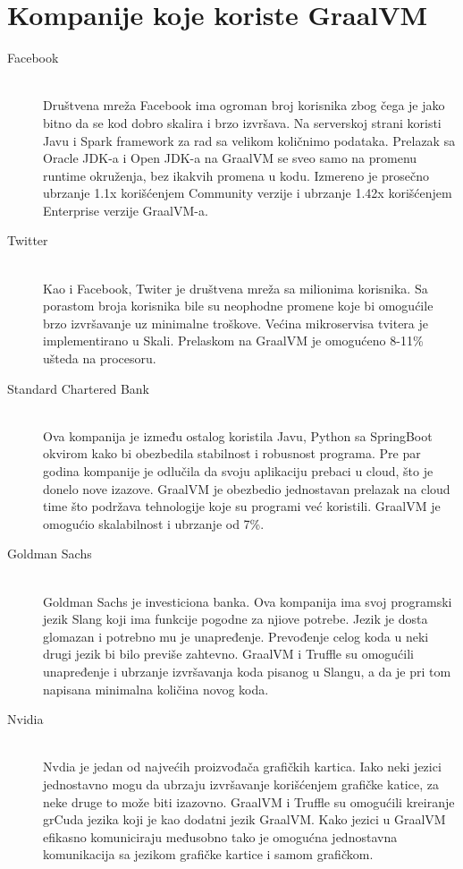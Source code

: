 \documentclass[a4paper]{article}
\begin{document}
\section{Kompanije koje koriste GraalVM}
\begin{description}
	\item[Facebook] \hfill \\
	Društvena mreža Facebook ima ogroman broj korisnika zbog čega je jako bitno da se kod dobro skalira i brzo izvršava.
	Na serverskoj strani koristi Javu i Spark framework za rad sa velikom količnimo podataka. Prelazak sa Oracle JDK-a i Open JDK-a na GraalVM se sveo samo na promenu runtime okruženja, bez ikakvih promena u kodu. Izmereno je prosečno ubrzanje 1.1x korišćenjem Community verzije i ubrzanje 1.42x korišćenjem Enterprise verzije GraalVM-a. \cite{graalvmusecases}
	
	\item[Twitter] \hfill \\
	Kao i Facebook, Twiter je društvena mreža sa milionima korisnika. Sa porastom broja korisnika bile su neophodne promene koje bi omogućile brzo izvršavanje uz minimalne troškove. Većina mikroservisa tvitera je implementirano u Skali. Prelaskom na GraalVM je omogućeno 8-11\% ušteda na procesoru. \cite{graalvmusecases}	
	
	\item[Standard Chartered Bank] \hfil \\
	Ova kompanija je između ostalog koristila Javu, Python sa SpringBoot okvirom kako bi obezbedila stabilnost i robusnost programa. Pre par godina kompanije je odlučila da svoju aplikaciju prebaci u cloud, što je donelo nove izazove. GraalVM je obezbedio jednostavan prelazak na cloud time što podržava tehnologije koje su programi već koristili. GraalVM je omogućio skalabilnost i ubrzanje od 7\%.\cite{graalvmusecases}
		
	\item[Goldman Sachs]  \hfil \\
	Goldman Sachs je investiciona banka. Ova kompanija ima svoj programski jezik Slang koji ima funkcije pogodne za njiove potrebe. Jezik je dosta glomazan i potrebno mu je unapređenje. Prevođenje celog koda u neki drugi jezik bi bilo previše zahtevno. GraalVM i Truffle su omogućili unapređenje i ubrzanje izvršavanja koda pisanog u Slangu, a da je pri tom napisana minimalna količina novog koda.\cite{graalvmusecases}
	
	\item[Nvidia]  \hfil \\
	Nvdia je jedan od najvećih proizvođača grafičkih kartica. Iako neki jezici jednostavno mogu da ubrzaju izvršavanje korišćenjem grafičke katice, za neke druge to može biti izazovno. GraalVM i Truffle su omogućili kreiranje grCuda jezika koji je kao dodatni jezik GraalVM. Kako jezici u GraalVM efikasno komuniciraju međusobno tako je omogućna jednostavna komunikacija sa jezikom grafičke kartice i samom grafičkom.\cite{graalvmusecases}
	

\end{description}
\end{document}
